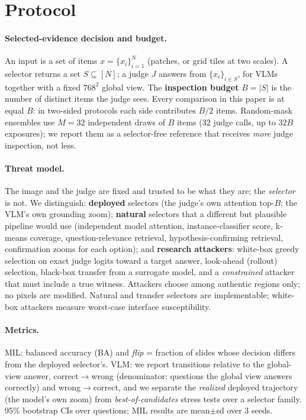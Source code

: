 \documentclass[10pt,twocolumn,letterpaper]{article}
\begin{document}
\section{Protocol}\label{sec:protocol}
\paragraph{Selected-evidence decision and budget.} An input is a set of items $x=\{x_i\}_{i=1}^N$ (patches, or grid tiles at two scales). A selector returns a set $S\subseteq[N]$; a judge $J$ answers from $\{x_i\}_{i\in S}$, for VLMs together with a fixed $768^2$ global view. The \textbf{inspection budget} $B=|S|$ is the number of distinct items the judge sees. Every comparison in this paper is at equal $B$: in two-sided protocols each side contributes $B/2$ items. Random-mask ensembles use $M{=}32$ independent draws of $B$ items (32 judge calls, up to $32B$ exposures); we report them as a selector-free reference that receives \emph{more} judge inspection, not less.
\paragraph{Threat model.} The image and the judge are fixed and trusted to be what they are; the \emph{selector} is not. We distinguish: \textbf{deployed} selectors (the judge's own attention top-$B$; the VLM's own grounding zoom); \textbf{natural} selectors that a different but plausible pipeline would use (independent model attention, instance-classifier score, k-means coverage, question-relevance retrieval, hypothesis-confirming retrieval, confirmation zooms for each option); and \textbf{research attackers}: white-box greedy selection on exact judge logits toward a target answer, look-ahead (rollout) selection, black-box transfer from a surrogate model, and a \emph{constrained} attacker that must include a true witness. Attackers choose among authentic regions only; no pixels are modified. Natural and transfer selectors are implementable; white-box attackers measure worst-case interface susceptibility.
\paragraph{Metrics.} MIL: balanced accuracy (BA) and \emph{flip} = fraction of slides whose decision differs from the deployed selector's. VLM: we report transitions relative to the global-view answer, correct$\to$wrong (denominator: questions the global view answers correctly) and wrong$\to$correct, and we separate the \emph{realized} deployed trajectory (the model's own zoom) from \emph{best-of-candidates} stress tests over a selector family. 95\% bootstrap CIs over questions; MIL results are mean$\pm$sd over 3 seeds.
\end{document}
